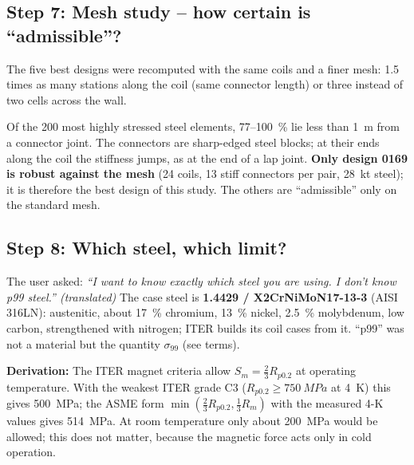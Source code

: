 \subsection*{Step 7: Mesh study -- how certain is ``admissible''?}
The five best designs were recomputed with the same coils and a finer mesh: 1.5 times as many stations along the
coil (same connector length) or three instead of two cells across the wall.
\begin{table}[H]\centering\small\caption{Mesh study: $\sigma_{99}$ and
largest element value in the steel (MPa).}\end{table}
Of the 200 most highly stressed steel elements, 77--100~\% lie less than \SI{1}{m} from a connector joint. The
connectors are sharp-edged steel blocks; at their ends along the coil the stiffness jumps, as at the end of a lap
joint. \textbf{Only design 0169 is robust against the mesh} (24 coils, 13 stiff connectors per pair, \SI{28}{kt}
steel); it is therefore the best design of this study. The others are ``admissible'' only on the standard mesh.

\subsection*{Step 8: Which steel, which limit?}\label{sec:stahl}
The user asked: \emph{“I want to know exactly which steel you are using. I don't know p99 steel.” (translated)} The case
steel is \textbf{1.4429 / X2CrNiMoN17-13-3} (AISI 316LN): austenitic, about 17~\% chromium, 13~\% nickel, 2.5~\%
molybdenum, low carbon, strengthened with nitrogen; ITER builds its coil cases from it. ``p99'' was not a material but
the quantity $\sigma_{99}$ (see terms).

\textbf{Derivation:} The ITER magnet criteria allow $S_m=\tfrac23R_{p0.2}$ at operating temperature. With the weakest
ITER grade C3 ($R_{p0.2}\ge\SI{750}{MPa}$ at \SI{4}{K}) this gives \SI{500}{MPa}; the ASME form
$\min(\tfrac23R_{p0.2},\tfrac13R_m)$ with the measured 4-K values gives \SI{514}{MPa}. At room temperature only about
\SI{200}{MPa} would be allowed; this does not matter, because the magnetic force acts only in cold operation.

